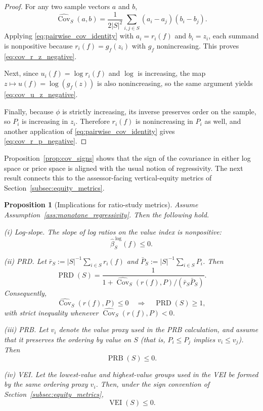 \documentclass[12pt, draft]{article}
\theoremstyle{plain}
\newtheorem{proposition}{Proposition}
\theoremstyle{definition}
\newcommand{\1}{\mathbf{1}}
\begin{document}
\begin{proof}
For any two sample vectors $a$ and $b$,
\begin{equation}
\label{eq:pairwise_cov_identity}
\widehat{\operatorname{Cov}}_S(a,b)
=
\frac{1}{2|S|^2}
\sum_{i,j\in S}
(a_i-a_j)(b_i-b_j).
\end{equation}
Applying \eqref{eq:pairwise_cov_identity} with $a_i=r_i(f)$ and $b_i=z_i$, each summand is nonpositive because $r_i(f)=g_f(z_i)$ with $g_f$ nonincreasing. This proves \eqref{eq:cov_r_z_negative}.

Next, since $u_i(f)=\log r_i(f)$ and $\log$ is increasing, the map $z\mapsto u(f)=\log(g_f(z))$ is also nonincreasing, so the same argument yields \eqref{eq:cov_u_z_negative}.

Finally, because $\phi$ is strictly increasing, its inverse preserves order on the sample, so $P_i$ is increasing in $z_i$. Therefore $r_i(f)$ is nonincreasing in $P_i$ as well, and another application of \eqref{eq:pairwise_cov_identity} gives \eqref{eq:cov_r_p_negative}.
\end{proof}

Proposition~\ref{prop:cov_signs} shows that the sign of the covariance in either log space or price space is aligned with the usual notion of regressivity. The next result connects this to the assessor-facing vertical-equity metrics of Section~\ref{subsec:equity_metrics}.

\begin{proposition}[Implications for ratio-study metrics]
\label{prop:metrics_alignment}
Assume Assumption~\ref{ass:monotone_regressivity}. Then the following hold.

\smallskip
\noindent
\emph{(i) Log-slope.} The slope of log ratios on the value index is nonpositive:
\[
\widehat\beta^{\,\log}_S(f)\le 0.
\]

\smallskip
\noindent
\emph{(ii) PRD.} Let $\bar r_S:=|S|^{-1}\sum_{i\in S} r_i(f)$ and $\bar P_S:=|S|^{-1}\sum_{i\in S} P_i$. Then
\begin{equation}
\label{eq:prd_cov_identity}
\operatorname{PRD}(S)
=
\frac{1}
{1+\widehat{\operatorname{Cov}}_S(r(f),P)/(\bar r_S\bar P_S)}.
\end{equation}
Consequently,
\[
\widehat{\operatorname{Cov}}_S(r(f),P)\le 0
\quad\Longrightarrow\quad
\operatorname{PRD}(S)\ge 1,
\]
with strict inequality whenever $\widehat{\operatorname{Cov}}_S(r(f),P)<0$.

\smallskip
\noindent
\emph{(iii) PRB.} Let $v_i$ denote the value proxy used in the PRB calculation, and assume that it preserves the ordering by value on $S$ (that is, $P_i\le P_j$ implies $v_i\le v_j$). Then
\[
\operatorname{PRB}(S)\le 0.
\]

\smallskip
\noindent
\emph{(iv) VEI.} Let the lowest-value and highest-value groups used in the VEI be formed by the same ordering proxy $v_i$. Then, under the sign convention of Section~\ref{subsec:equity_metrics},
\[
\operatorname{VEI}(S)\le 0.
\]
\end{proposition}
\end{document}
